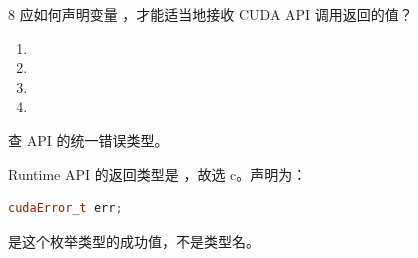 \begin{solutionexercise}{8}
\problemheading 应如何声明变量 ，才能适当地接收 CUDA API 调用返回的值？
\begin{enumerate}[label=\alph*.,leftmargin=2.2em]
  \item {}
  \item {}
  \item {}
  \item {}
\end{enumerate}

\approachheading 查 API 的统一错误类型。

\answerheading Runtime API 的返回类型是 ，故选 c。声明为：
\begin{lstlisting}[language=C++,numbers=none]
cudaError_t err;
\end{lstlisting}
 是这个枚举类型的成功值，不是类型名。


\end{solutionexercise}
